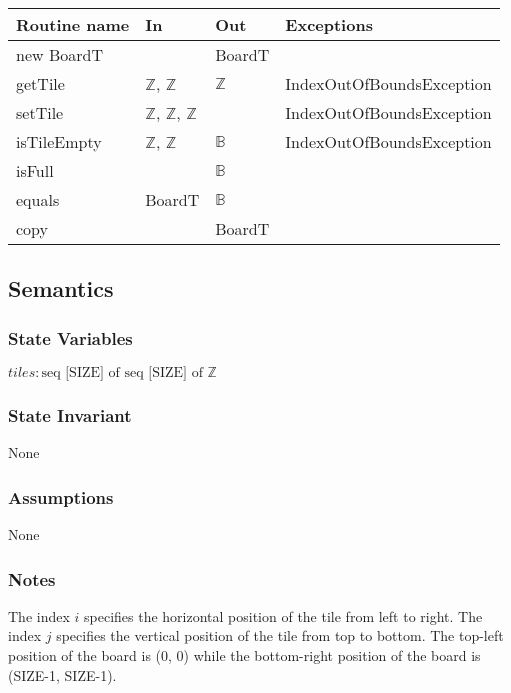\documentclass[12pt]{article}
\begin{document}
\begin{tabular}{| l | l | l | p{6cm} |}
\hline
\textbf{Routine name} & \textbf{In} & \textbf{Out} & \textbf{Exceptions}\\
\hline
new BoardT &  & BoardT & \\
\hline
getTile & $\mathbb{Z}$, $\mathbb{Z}$ & $\mathbb{Z}$ & IndexOutOfBoundsException \\
\hline
setTile & $\mathbb{Z}$, $\mathbb{Z}$, $\mathbb{Z}$ &  & IndexOutOfBoundsException \\
\hline
isTileEmpty & $\mathbb{Z}$, $\mathbb{Z}$ & $\mathbb{B}$ & IndexOutOfBoundsException \\
\hline
isFull &  & $\mathbb{B}$ & \\
\hline
equals & BoardT & $\mathbb{B}$ & \\
\hline
copy &  & BoardT  & \\
\hline
\end{tabular}

\subsection* {Semantics}

\subsubsection* {State Variables}

$tiles: \text{seq [SIZE] of seq [SIZE] of $\mathbb{Z}$}$

\subsubsection* {State Invariant}

None

\subsubsection* {Assumptions}

None

\subsubsection* {Notes}

The index $i$ specifies the horizontal position of the tile from left to right. The index $j$ specifies the vertical position of the tile from top to bottom. The top-left position of the board is (0, 0) while the bottom-right position of the board is (SIZE-1, SIZE-1).
\end{document}
